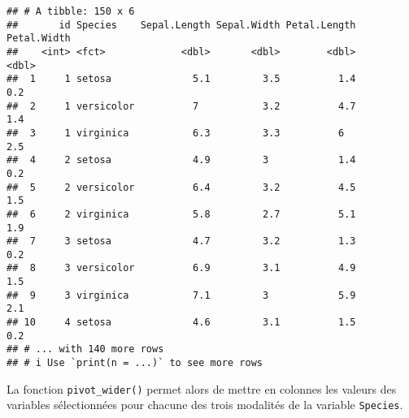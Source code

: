 \documentclass[
  french,
]{book}
\newenvironment{Shaded}{\begin{snugshade}}{\end{snugshade}}
\newcommand{\DataTypeTok}[1]{\textcolor[rgb]{0.13,0.29,0.53}{#1}}
\newcommand{\KeywordTok}[1]{\textcolor[rgb]{0.13,0.29,0.53}{\textbf{#1}}}
\newcommand{\NormalTok}[1]{#1}
\newcommand{\OperatorTok}[1]{\textcolor[rgb]{0.81,0.36,0.00}{\textbf{#1}}}
\newcommand{\StringTok}[1]{\textcolor[rgb]{0.31,0.60,0.02}{#1}}
\begin{document}
\begin{verbatim}
## # A tibble: 150 x 6
##       id Species    Sepal.Length Sepal.Width Petal.Length Petal.Width
##    <int> <fct>             <dbl>       <dbl>        <dbl>       <dbl>
##  1     1 setosa              5.1         3.5          1.4         0.2
##  2     1 versicolor          7           3.2          4.7         1.4
##  3     1 virginica           6.3         3.3          6           2.5
##  4     2 setosa              4.9         3            1.4         0.2
##  5     2 versicolor          6.4         3.2          4.5         1.5
##  6     2 virginica           5.8         2.7          5.1         1.9
##  7     3 setosa              4.7         3.2          1.3         0.2
##  8     3 versicolor          6.9         3.1          4.9         1.5
##  9     3 virginica           7.1         3            5.9         2.1
## 10     4 setosa              4.6         3.1          1.5         0.2
## # ... with 140 more rows
## # i Use `print(n = ...)` to see more rows
\end{verbatim}

La fonction \texttt{pivot\_wider()} permet alors de mettre en colonnes les valeurs des variables sélectionnées pour chacune des trois modalités de la variable \texttt{Species}.

\begin{Shaded}
\end{Shaded}
\end{document}
